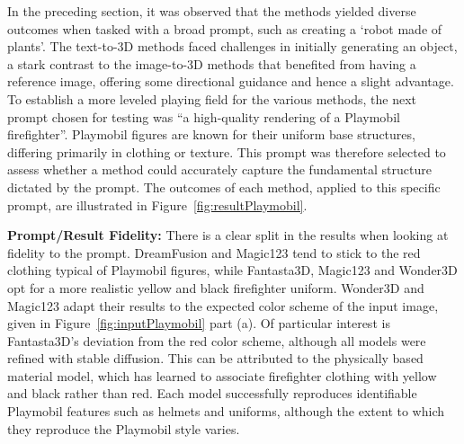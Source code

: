 In the preceding section, it was observed that the methods yielded diverse outcomes when tasked with a broad prompt, such as creating a `robot made of plants'. The text-to-3D methods faced challenges in initially generating an object, a stark contrast to the image-to-3D methods that benefited from having a reference image, offering some directional guidance and hence a slight advantage. To establish a more leveled playing field for the various methods, the next prompt chosen for testing was ``a high-quality rendering of a Playmobil firefighter''. Playmobil figures are known for their uniform base structures, differing primarily in clothing or texture. This prompt was therefore selected to assess whether a method could accurately capture the fundamental structure dictated by the prompt. The outcomes of each method, applied to this specific prompt, are illustrated in Figure~\ref{fig:resultPlaymobil}. 

\textbf{Prompt/Result Fidelity:} There is a clear split in the results when looking at fidelity to the prompt. DreamFusion and Magic123 tend to stick to the red clothing typical of Playmobil figures, while Fantasta3D, Magic123 and Wonder3D opt for a more realistic yellow and black firefighter uniform. Wonder3D and Magic123 adapt their results to the expected color scheme of the input image, given in Figure~\ref{fig:inputPlaymobil} part (a). Of particular interest is Fantasta3D's deviation from the red color scheme, although all models were refined with stable diffusion. This can be attributed to the physically based material model, which has learned to associate firefighter clothing with yellow and black rather than red. Each model successfully reproduces identifiable Playmobil features such as helmets and uniforms, although the extent to which they reproduce the Playmobil style varies.

